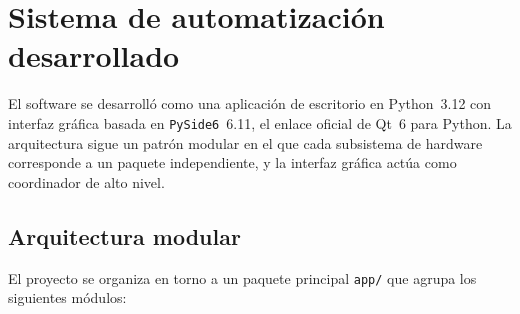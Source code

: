 \section{Sistema de automatización desarrollado}
\label{sec:sistema}

El software se desarrolló como una aplicación de escritorio en
Python~3.12 con interfaz gráfica basada en \texttt{PySide6}~6.11, el
enlace oficial de Qt~6 para Python. La arquitectura sigue un patrón
modular en el que cada subsistema de hardware corresponde a un paquete
independiente, y la interfaz gráfica actúa como coordinador de alto
nivel.

\subsection{Arquitectura modular}
\label{sec:arquitectura}

El proyecto se organiza en torno a un paquete principal \texttt{app/}
que agrupa los siguientes módulos:

